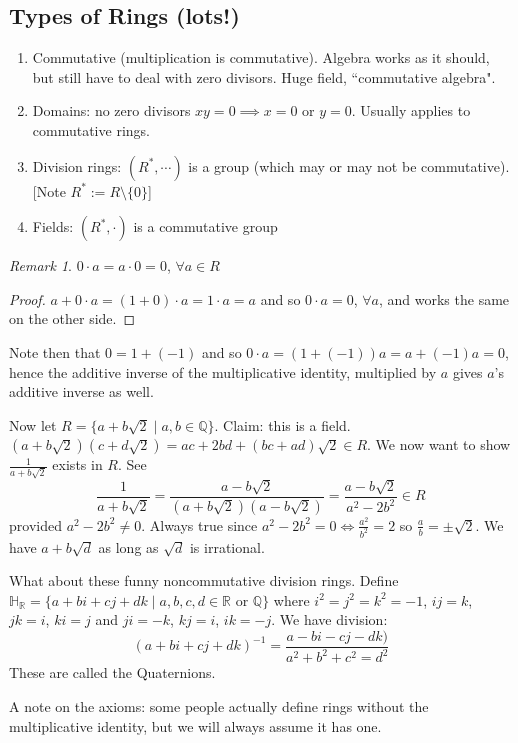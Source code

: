 \documentclass{article}
\theoremstyle{plain}
\theoremstyle{remark}
\newtheorem{remark}{Remark}
\newcommand{\Q}{{\mathbb Q}}
\newcommand{\R}{{\mathbb R}}
\begin{document}
\subsection{Types of Rings (lots!)}
\begin{enumerate}
	\item Commutative (multiplication is commutative).
		Algebra works as it should, but still have to deal with zero divisors.
		Huge field, ``commutative algebra".
	\item Domains: no zero divisors $xy = 0 \implies x = 0$ or $y = 0$.
		Usually applies to commutative rings.
	\item Division rings: $(R^*, \cdots)$ is a group (which may or may not be commutative).
		[Note $R^* := R \setminus \{0\}$]
	\item Fields: $(R^*, \cdot)$ is a commutative group
\end{enumerate}
\begin{remark}
	$0 \cdot a = a \cdot 0 = 0$, $\forall a \in R$
\end{remark}
\begin{proof}
	$a + 0 \cdot a = (1 + 0)\cdot a = 1\cdot a = a$
	and so $0 \cdot a = 0 $, $\forall a$,
	and works the same on the other side.
\end{proof}
Note then that $0 = 1 + (-1)$ and so $0 \cdot a = (1 + (-1))a = a + (-1)a = 0$,
hence the additive inverse of the multiplicative identity,
multiplied by $a$ gives $a$'s additive inverse as well.

Now let $R = \{a + b\sqrt{2} \mid a,b \in \Q\}$.
Claim: this is a field.
$(a + b \sqrt{2})(c + d\sqrt{2}) = ac + 2bd + (bc + ad) \sqrt{2} \in R$.
We now want to show $\frac{1}{a+b\sqrt{2}}$ exists in $R$.
See
\[
	\frac{1}{a+b\sqrt{2}} = \frac{a-b\sqrt{2}}{(a+b\sqrt{2})(a - b\sqrt{2})}
		= \frac{a - b\sqrt{2}}{a^2 - 2b^2} \in R
\]
provided $a^2 - 2b^2 \neq 0$.
Always true since $a^2 - 2b^2 = 0 \iff \frac{a^2}{b^2} = 2$ so $\frac{a}{b} = \pm \sqrt{2}$.
We have $a + b \sqrt{d}$ as long as $\sqrt{d}$ is irrational.

What about these funny noncommutative division rings.
Define $\mathbb{H}_\R = \{a + bi + cj + dk \mid a,b,c,d \in \R \text{ or } \Q\}$ where
$i^2 = j^2 = k^2 = -1$, $ij = k$, $jk = i$, $ki = j$
and $ji = -k$, $kj = i$, $ik = -j$.
We have division:
\[
	(a + bi + cj + dk)^{-1} = \frac{a - bi - cj - dk)}{a^2 + b^2 + c^2 = d^2}
\]
These are called the Quaternions.

A note on the axioms: some people actually define rings without the multiplicative identity,
but we will always assume it has one.
\end{document}
